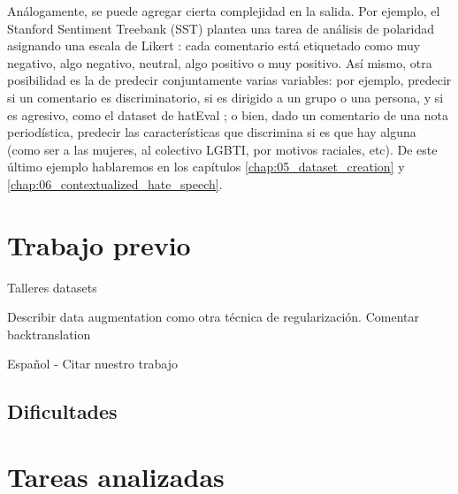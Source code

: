 Análogamente, se puede agregar cierta complejidad en la salida. Por ejemplo, el Stanford Sentiment Treebank (SST) \cite{socher-etal-2013-recursive} plantea una tarea de análisis de polaridad asignando una escala de Likert \cite{likert1932technique}: cada comentario está etiquetado como muy negativo, algo negativo, neutral, algo positivo o muy positivo. Así mismo, otra posibilidad es la de predecir conjuntamente varias variables: por ejemplo, predecir si un comentario es discriminatorio, si es dirigido a un grupo o una persona, y si es agresivo, como el dataset de hatEval \cite{hateval2019semeval}; o bien, dado un comentario de una nota periodística, predecir las características que discrimina si es que hay alguna (como ser a las mujeres, al colectivo LGBTI, por motivos raciales, etc). De este último ejemplo hablaremos en los capítulos \ref{chap:05_dataset_creation} y \ref{chap:06_contextualized_hate_speech}.




\section{Trabajo previo}

Talleres
datasets


Describir data augmentation como otra técnica de regularización. Comentar backtranslation

Español
- Citar nuestro trabajo

\subsection{Dificultades}

\section{Tareas analizadas}

